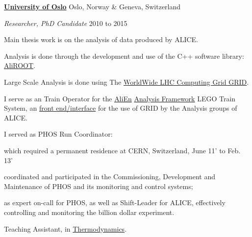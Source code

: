 \documentclass[11pt]{article}
\newenvironment{outerlist}[1][\enskip\textbullet]%
        {\begin{itemize}[#1]}{\end{itemize}%
         \vspace{-.6\baselineskip}}
\newenvironment{innerlist}[1][\enskip\textbullet]%
        {\begin{compactitem}[#1]}{\end{compactitem}}
\newcommand{\blankline}{\quad\pagebreak[2]}
\begin{document}
\href{http://www.uib.no/en}{\textbf{University of Oslo}}
Oslo, Norway \& Geneva, Switzerland
\begin{outerlist}
\item[] \textit{Researcher, PhD Candidate}
  \hfill 2010 to 2015
  \begin{innerlist}
    \footnotesize
  \item Main thesis work is on the analysis of data produced by ALICE.
    \begin{innerlist}
    \item Analysis is done through the development and use of the 
      C++ software library: 
      \href{http://aliweb.cern.ch/Offline/AliRoot/Manual.html}{AliROOT}.
    \item Large Scale Analysis is done using The 
      \href{http://wlcg.web.cern.ch/}{WorldWide LHC Computing Grid GRID}.
    \item I serve as an Train Operator for the \href{alien2.cern.ch}{AliEn} 
      \href{http://aliweb.cern.ch/Offline/Activities/Analysis/AnalysisFramework/index.html}{Analysis Framework} LEGO Train System, an 
      \href{http://alimonitor.cern.ch/map.jsp}{front end/interface} 
      for the use of GRID by the Analysis groups of ALICE.
    \end{innerlist}
  \item I served as PHOS Run Coordinator:
    \begin{innerlist}
    \item which required a permanent residence at CERN, Switzerland, 
      June 11' to Feb. 13'
    \item coordinated and participated in the Commissioning, 
      Development and Maintenance of PHOS and its monitoring and control systems;
    \item as expert on-call for PHOS, as well as Shift-Leader for ALICE, 
      effectively controlling and monitoring the billion dollar experiment.
    \end{innerlist}
  \item Teaching Assistant, in \href{http://www.uio.no/studier/emner/matnat/fys/FYS2160/index-eng.html}{Thermodynamics}.
  \end{innerlist}
\end{outerlist}

\blankline
\end{document}
